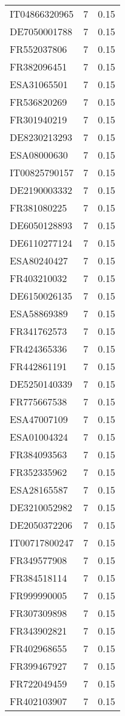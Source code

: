 \begin{table*}[htbp]
\begin{tabular}{lrr}
IT04866320965 & 7 & 0.15 \\
DE7050001788 & 7 & 0.15 \\
FR552037806 & 7 & 0.15 \\
FR382096451 & 7 & 0.15 \\
ESA31065501 & 7 & 0.15 \\
FR536820269 & 7 & 0.15 \\
FR301940219 & 7 & 0.15 \\
DE8230213293 & 7 & 0.15 \\
ESA08000630 & 7 & 0.15 \\
IT00825790157 & 7 & 0.15 \\
DE2190003332 & 7 & 0.15 \\
FR381080225 & 7 & 0.15 \\
DE6050128893 & 7 & 0.15 \\
DE6110277124 & 7 & 0.15 \\
ESA80240427 & 7 & 0.15 \\
FR403210032 & 7 & 0.15 \\
DE6150026135 & 7 & 0.15 \\
ESA58869389 & 7 & 0.15 \\
FR341762573 & 7 & 0.15 \\
FR424365336 & 7 & 0.15 \\
FR442861191 & 7 & 0.15 \\
DE5250140339 & 7 & 0.15 \\
FR775667538 & 7 & 0.15 \\
ESA47007109 & 7 & 0.15 \\
ESA01004324 & 7 & 0.15 \\
FR384093563 & 7 & 0.15 \\
FR352335962 & 7 & 0.15 \\
ESA28165587 & 7 & 0.15 \\
DE3210052982 & 7 & 0.15 \\
DE2050372206 & 7 & 0.15 \\
IT00717800247 & 7 & 0.15 \\
FR349577908 & 7 & 0.15 \\
FR384518114 & 7 & 0.15 \\
FR999990005 & 7 & 0.15 \\
FR307309898 & 7 & 0.15 \\
FR343902821 & 7 & 0.15 \\
FR402968655 & 7 & 0.15 \\
FR399467927 & 7 & 0.15 \\
FR722049459 & 7 & 0.15 \\
FR402103907 & 7 & 0.15 \\

\end{tabular}
\end{table*}
